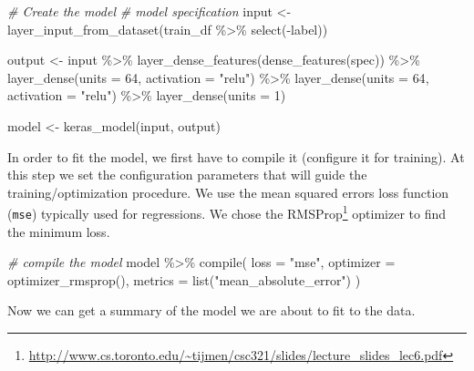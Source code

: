 \documentclass[
  12pt,
]{style/krantz}
\newenvironment{Shaded}{\begin{snugshade}}{\end{snugshade}}
\newcommand{\AttributeTok}[1]{\textcolor[rgb]{0.77,0.63,0.00}{#1}}
\newcommand{\CommentTok}[1]{\textcolor[rgb]{0.56,0.35,0.01}{\textit{#1}}}
\newcommand{\DecValTok}[1]{\textcolor[rgb]{0.00,0.00,0.81}{#1}}
\newcommand{\FunctionTok}[1]{\textcolor[rgb]{0.00,0.00,0.00}{#1}}
\newcommand{\NormalTok}[1]{#1}
\newcommand{\OtherTok}[1]{\textcolor[rgb]{0.56,0.35,0.01}{#1}}
\newcommand{\SpecialCharTok}[1]{\textcolor[rgb]{0.00,0.00,0.00}{#1}}
\newcommand{\StringTok}[1]{\textcolor[rgb]{0.31,0.60,0.02}{#1}}
\renewcommand{\href}[2]{#2\footnote{\url{#1}}}
\begin{document}
\begin{Shaded}
\begin{Highlighting}[]
\CommentTok{\# Create the model}
\CommentTok{\# model specification}
\NormalTok{input }\OtherTok{\textless{}{-}} \FunctionTok{layer\_input\_from\_dataset}\NormalTok{(train\_df }\SpecialCharTok{\%\textgreater{}\%} \FunctionTok{select}\NormalTok{(}\SpecialCharTok{{-}}\NormalTok{label))}

\NormalTok{output }\OtherTok{\textless{}{-}}\NormalTok{ input }\SpecialCharTok{\%\textgreater{}\%} 
  \FunctionTok{layer\_dense\_features}\NormalTok{(}\FunctionTok{dense\_features}\NormalTok{(spec)) }\SpecialCharTok{\%\textgreater{}\%} 
  \FunctionTok{layer\_dense}\NormalTok{(}\AttributeTok{units =} \DecValTok{64}\NormalTok{, }\AttributeTok{activation =} \StringTok{"relu"}\NormalTok{) }\SpecialCharTok{\%\textgreater{}\%}
  \FunctionTok{layer\_dense}\NormalTok{(}\AttributeTok{units =} \DecValTok{64}\NormalTok{, }\AttributeTok{activation =} \StringTok{"relu"}\NormalTok{) }\SpecialCharTok{\%\textgreater{}\%}
  \FunctionTok{layer\_dense}\NormalTok{(}\AttributeTok{units =} \DecValTok{1}\NormalTok{) }

\NormalTok{model }\OtherTok{\textless{}{-}} \FunctionTok{keras\_model}\NormalTok{(input, output)}
\end{Highlighting}
\end{Shaded}

In order to fit the model, we first have to compile it (configure it for training). At this step we set the configuration parameters that will guide the training/optimization procedure. We use the mean squared errors loss function (\texttt{mse}) typically used for regressions. We chose the \href{http://www.cs.toronto.edu/~tijmen/csc321/slides/lecture_slides_lec6.pdf}{RMSProp} optimizer to find the minimum loss.

\begin{Shaded}
\begin{Highlighting}[]
\CommentTok{\# compile the model  }
\NormalTok{model }\SpecialCharTok{\%\textgreater{}\%} 
  \FunctionTok{compile}\NormalTok{(}
    \AttributeTok{loss =} \StringTok{"mse"}\NormalTok{,}
    \AttributeTok{optimizer =} \FunctionTok{optimizer\_rmsprop}\NormalTok{(),}
    \AttributeTok{metrics =} \FunctionTok{list}\NormalTok{(}\StringTok{"mean\_absolute\_error"}\NormalTok{)}
\NormalTok{  )}
\end{Highlighting}
\end{Shaded}

Now we can get a summary of the model we are about to fit to the data.
\end{document}
